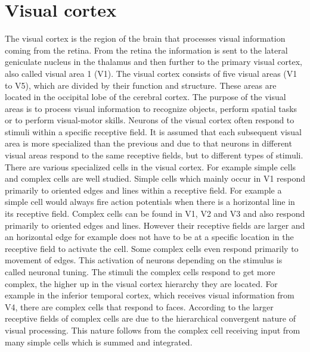 \section{Visual cortex}

The visual cortex is the region of the brain that processes visual information coming from the retina. From the retina the information is sent to the lateral geniculate nucleus in the thalamus and then further to the primary visual cortex, also called visual area 1 (V1). The visual cortex consists of five visual areas (V1 to V5), which are divided by their function and structure. These areas are located in the occipital lobe of the cerebral cortex. The purpose of the visual areas is to process visual information to recognize objects, perform spatial tasks or to perform  visual-motor skills. Neurons of the visual cortex often respond to stimuli within a specific receptive field. It is assumed that each subsequent visual area is more specialized than the previous and due to that neurons in different visual areas respond to the same receptive fields, but to different types of stimuli. There are various specialized cells in the visual cortex. For example simple cells and complex cells are well studied. Simple cells which mainly occur in V1 respond primarily to oriented edges and lines within a receptive field. For example a simple cell would always fire action potentials when there is a horizontal line in its receptive field. Complex cells can be found in V1, V2 and V3 and also respond primarily to oriented edges and lines. However their receptive fields are larger and an horizontal edge for example does not have to be at a specific location in the receptive field to activate the cell. Some complex cells even respond primarily to movement of edges. \citep{visualCortexBook}
This activation of neurons depending on the stimulus is called neuronal tuning. The stimuli the complex cells respond to get more complex, the higher up in the visual cortex hierarchy they are located. For example in the inferior temporal cortex, which receives visual information from V4, there are complex cells that respond to faces. \citep{complexCellsFaces}
According to \citet{complexCellsIntegrated} the larger receptive fields of complex cells are due to the hierarchical convergent nature of visual processing. This nature follows from the complex cell receiving input from many simple cells which is summed and integrated.

